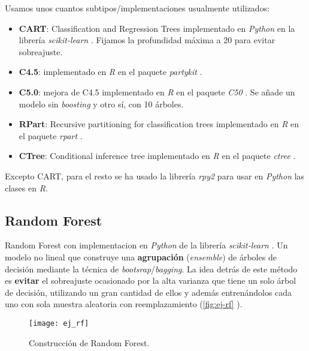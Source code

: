 Usamos unos cuantos subtipos/implementaciones usualmente utilizados:

\begin{itemize}
  \item \textbf{CART}: Classification and Regression Trees \cite{breiman1984classification} implementado en \emph{Python} en la librería \emph{scikit-learn} \cite{scikit2020dt}. Fijamos la profundidad máxima a 20 para evitar sobreajuste.
  \item \textbf{C4.5}: \cite{quinlan2014c4} implementado en \emph{R} en el paquete \emph{partykit} \cite{hornik2020c45}.
  \item \textbf{C5.0}: mejora de C4.5 \cite{quinlan2019c50} implementado en \emph{R} en el paquete \emph{C50} \cite{kuhn2020c50}. Se añade un modelo sin \emph{boosting} y otro sí, con 10 árboles.
  \item \textbf{RPart}: Recursive partitioning for classification trees \cite{breiman1984classification} implementado en \emph{R} en el paquete \emph{rpart} \cite{atkinson2019rpart}.
  \item \textbf{CTree}: Conditional inference tree \cite{hothorn2006unbiased, hothorn2015ctree} implementado en \emph{R} en el paquete \emph{ctree} \cite{hothorn2020ctree}.
\end{itemize}

Excepto CART, para el resto se ha usado la librería \emph{rpy2} \cite{gautier2020rpy2} para usar en \emph{Python} las clases en \emph{R}.

\subsection{Random Forest}

Random Forest \cite{ho1995random, breiman2001random} con implementacion en \emph{Python} de la librería \emph{scikit-learn} \cite{scikit2020rf}. Un modelo no lineal que construye una \textbf{agrupación} (\emph{ensemble}) de árboles de decisión mediante la técnica de \emph{bootsrap}/\emph{bagging}. La idea detrás de este método es \textbf{evitar} el sobreajuste ocasionado por la alta varianza que tiene un solo árbol de decisión, utilizando un gran cantidad de ellos y además entrenándolos cada uno con sola muestra aleatoria con reemplazamiento (\autoref{fig:ej-rf} \cite{orellana2018rf}).

\begin{figure}[htbp]
  \centering
  \texttt{[image: ej\_rf]}
  \caption{Construcción de Random Forest.}
  \label{fig:ej-rf}
\end{figure}

